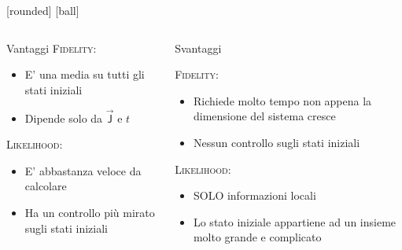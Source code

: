 \documentclass[xcolor=x11names,compress]{beamer}
\renewcommand{\(}{\begin{columns}}
\renewcommand{\)}{\end{columns}}
\newcommand{\<}[1]{\begin{column}{#1}}
\renewcommand{\>}{\end{column}}
\begin{document}
\begin{frame}

[rounded]
[ball]

\begin{columns}[c]
\begin{column}{0.45\textwidth}
\begin{block}{\textsf{\small{Vantaggi}}}
\textsc{Fidelity:}
\begin{itemize}
  \item \footnotesize{E' una media su tutti gli stati iniziali} 
  \item \footnotesize{Dipende solo da $\vec{\textsf{J}}$ e $t$}
\end{itemize}
\textsc{Likelihood:}
\begin{itemize}
  \item \footnotesize{E' abbastanza veloce da calcolare} 
  \item \footnotesize{Ha un controllo più mirato sugli stati iniziali}
\end{itemize}

\end{block}
\end{column}
\hspace{-20pt}

\begin{column}{0.45\textwidth}


\begin{block}{\textsf{\small{Svantaggi}}}

\textsc{Fidelity:}
\begin{itemize}
  \item \footnotesize{Richiede molto tempo non appena la dimensione del sistema cresce} 
  \item \footnotesize{Nessun controllo sugli stati iniziali}
\end{itemize}
\textsc{Likelihood:}
\begin{itemize}
  \item \footnotesize{SOLO informazioni locali} 
  \item \footnotesize{Lo stato iniziale appartiene ad un insieme molto grande e complicato}
\end{itemize}


\end{block}
\end{column}
\end{columns}
\end{frame}
\end{document}
